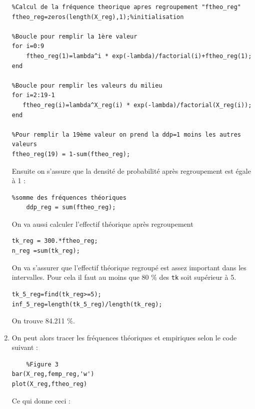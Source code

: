 \documentclass[a4paper,oneside]{article}
\begin{document}
\begin{enumerate}
\begin{lstlisting}
%Calcul de la fréquence theorique apres regroupement "ftheo_reg"
ftheo_reg=zeros(length(X_reg),1);%initialisation

%Boucle pour remplir la 1ère valeur
for i=0:9 
    ftheo_reg(1)=lambda^i * exp(-lambda)/factorial(i)+ftheo_reg(1);
end

%Boucle pour remplir les valeurs du milieu
for i=2:19-1
   ftheo_reg(i)=lambda^X_reg(i) * exp(-lambda)/factorial(X_reg(i));
end    

%Pour remplir la 19ème valeur on prend la ddp=1 moins les autres valeurs
ftheo_reg(19) = 1-sum(ftheo_reg);
\end{lstlisting}


Ensuite on s'assure que la densité de probabilité après regroupement est égale à 1 :

\begin{lstlisting}
%somme des fréquences théoriques
	ddp_reg = sum(ftheo_reg);
\end{lstlisting}


On va aussi calculer l'effectif théorique après regroupement 

\begin{lstlisting}
tk_reg = 300.*ftheo_reg;
n_reg =sum(tk_reg);

\end{lstlisting}

On va s'assurer que l'effectif théorique regroupé est assez important dans les intervalles. Pour cela il faut au moins que 80 $\%$ des \verb?tk? soit supérieur à 5.

\begin{lstlisting}
tk_5_reg=find(tk_reg>=5);
inf_5_reg=length(tk_5_reg)/length(tk_reg);
\end{lstlisting}

On trouve 84.211 $\%$.
\newpage
\item

On peut alors tracer les fréquences théoriques et empiriques selon le code suivant :

\begin{lstlisting}
	%Figure 3
bar(X_reg,femp_reg,'w')
plot(X_reg,ftheo_reg)
\end{lstlisting}

Ce qui donne ceci :


\end{enumerate}
\end{document}
